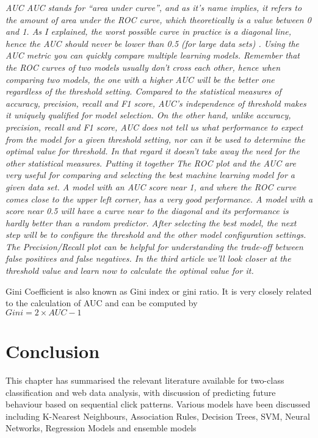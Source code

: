 \textit{AUC
AUC stands for “area under curve”, and as it's name implies, it refers to the amount of area under the ROC curve, which theoretically is a value between 0 and 1. As I explained, the worst possible curve in practice is a diagonal line, hence the AUC should never be lower than 0.5 (for large data sets) .
Using the AUC metric you can quickly compare multiple learning models. Remember that the ROC curves of two models usually don’t cross each other, hence when comparing two models, the one with a higher AUC will be the better one regardless of the threshold setting. Compared to the statistical measures of accuracy, precision, recall and F1 score, AUC’s independence of threshold makes it uniquely qualified for model selection.
On the other hand, unlike accuracy, precision, recall and F1 score, AUC does not tell us what performance to expect from the model for a given threshold setting, nor can it be used to determine the optimal value for threshold. In that regard it doesn't take away the need for the other statistical measures.
Putting it together
The ROC plot and the AUC are very useful for comparing and selecting the best machine learning model for a given data set. A model with an AUC score near 1, and where the ROC curve comes close to the upper left corner, has a very good performance. A model with a score near 0.5 will have a curve near to the diagonal and its performance is hardly better than a random predictor.
After selecting the best model, the next step will be to configure the threshold and the other model configuration settings. The Precision/Recall plot can be helpful for understanding the trade-off between false positives and false negatives. In the third article we’ll look closer at the threshold value and learn now to calculate the optimal value for it.
}

Gini Coefficient is also known as Gini index or gini ratio. It is very closely related to the calculation of AUC and can be computed by\\
$Gini = 2 \times AUC - 1$


\section{Conclusion}\label{sotaConc}
This chapter has summarised the relevant literature available for two-class classification and web data analysis, with discussion of predicting future behaviour based on sequential click patterns. Various models have been discussed including K-Nearest Neighbours, Association Rules, Decision Trees, SVM, Neural Networks, Regression Models and ensemble models

